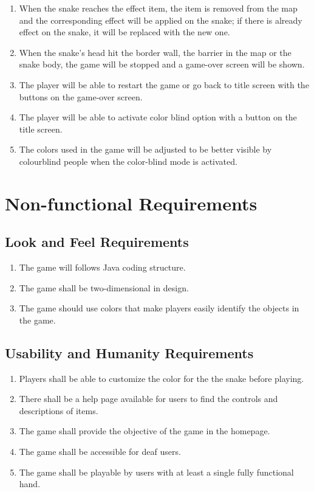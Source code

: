 \documentclass[12pt, titlepage]{article}
\begin{document}
\begin{enumerate}[{FR}1.]
    \item When the snake reaches the effect item, the item is removed from the map and the corresponding effect will be applied on the snake; if there is already effect on the snake, it will be replaced with the new one.
    \item When the snake's head hit the border wall, the barrier in the map or the snake body, the game will be stopped and a game-over screen will be shown.
    \item The player will be able to restart the game or go back to title screen with the buttons on the game-over screen.
    \item The player will be able to activate color blind option with a button on the title screen.
    \item The colors used in the game will be adjusted to be better visible by  colourblind people when the color-blind mode is activated.
\end{enumerate}
\section{Non-functional Requirements}

\subsection{Look and Feel Requirements}
\begin{enumerate}[{LF}1. ]
	\item The game will follows Java coding structure.
	\item The game shall be two-dimensional in design.
	\item The game should use colors that make players  easily identify the objects in the game.
\end{enumerate}
\subsection{Usability and Humanity Requirements}
\begin{enumerate}[{UH}1. ]
	\item  Players shall be able to customize the color for the the snake before playing.
	\item There shall be a help page available for users to find the controls and descriptions of items.
	\item The game shall provide the objective of the game in the homepage.
	\item The game shall be accessible for deaf users.
	\item The game shall be playable by users with at least a single fully functional hand.
\end{enumerate}
\end{document}

